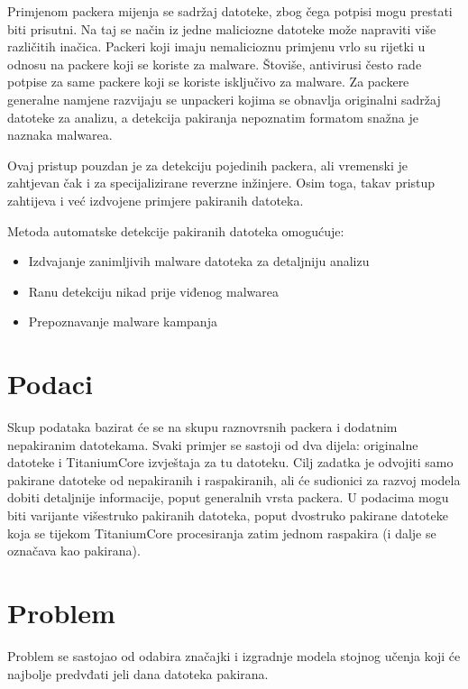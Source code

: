 \documentclass[conference]{IEEEtran}
\begin{document}
Primjenom packera mijenja se sadržaj datoteke, zbog čega potpisi mogu prestati biti prisutni. Na taj se način iz jedne maliciozne datoteke može napraviti više različitih inačica. Packeri koji imaju nemalicioznu primjenu vrlo su rijetki u odnosu na packere koji se koriste za malware. Štoviše, antivirusi često rade potpise za same packere koji se koriste isključivo za malware. Za packere generalne namjene razvijaju se unpackeri kojima se obnavlja originalni sadržaj datoteke za analizu, a detekcija pakiranja nepoznatim formatom snažna je naznaka malwarea.

Ovaj pristup pouzdan je za detekciju pojedinih packera, ali vremenski je zahtjevan čak i za specijalizirane reverzne inžinjere. Osim toga, takav pristup zahtijeva i već izdvojene primjere pakiranih datoteka.

Metoda automatske detekcije pakiranih datoteka omogućuje:
\begin{itemize}
\item Izdvajanje zanimljivih malware datoteka za detaljniju analizu
\item Ranu detekciju nikad prije viđenog malwarea
\item Prepoznavanje malware kampanja 
\end{itemize}


\section{Podaci}
Skup podataka bazirat će se na skupu raznovrsnih packera 
i dodatnim nepakiranim datotekama. Svaki primjer se sastoji 
od dva dijela: originalne datoteke i TitaniumCore izvještaja 
za tu datoteku. 
Cilj zadatka je odvojiti samo pakirane datoteke od 
nepakiranih i raspakiranih, ali će sudionici za razvoj 
modela dobiti detaljnije informacije, poput generalnih 
vrsta packera. U podacima mogu biti varijante višestruko 
pakiranih datoteka, poput dvostruko pakirane datoteke 
koja se tijekom TitaniumCore procesiranja zatim 
jednom raspakira (i dalje se označava kao pakirana).

\section{Problem}
Problem se sastojao od odabira značajki i izgradnje modela stojnog učenja koji će najbolje predvđati jeli dana datoteka pakirana.
\end{document}
